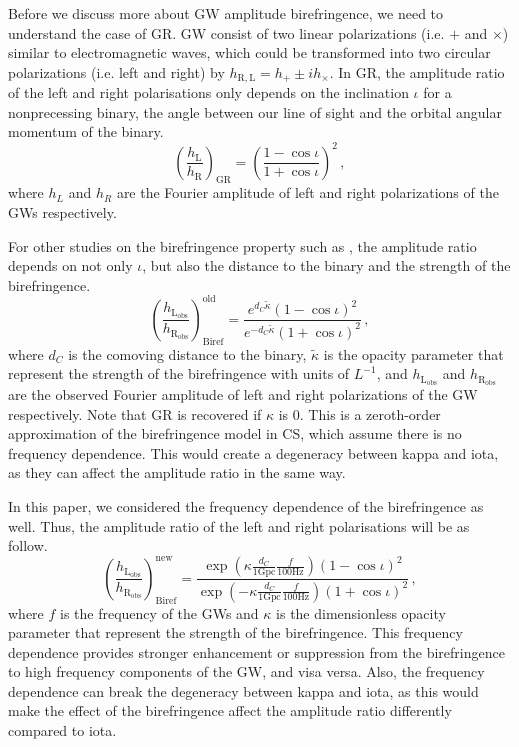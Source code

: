 \documentclass[twocolumn]{aastex631}
\begin{document}
Before we discuss more about GW amplitude birefringence, we need to understand the case of GR.
GW consist of two linear polarizations (i.e. $+$ and $\times$) similar to electromagnetic waves,
which could be transformed into two circular polarizations (i.e. left and right) by $h_{\mathrm{R}, \mathrm{L}} = h_+ \pm i h_\times$.
In GR, the amplitude ratio of the left and right polarisations only depends on the inclination $\iota$ for a nonprecessing binary,
the angle between our line of sight and the orbital angular momentum of the binary.
\begin{equation}
    \left(\frac{h_\mathrm{L}}{h_\mathrm{R}}\right)_\mathrm{GR}=\left(\frac{1-\cos\iota}{1+\cos\iota}\right)^2\,,
\end{equation}where $h_L$ and $h_R$ are the Fourier amplitude of left and right polarizations of the GWs respectively.

For other studies on the birefringence property such as \citet{Maria_2021}, the amplitude ratio depends on not only $\iota$,
but also the distance to the binary and the strength of the birefringence.
\begin{equation}
    \left(\frac{h_\mathrm{L_{obs}}}{h_\mathrm{R_{obs}}}\right)_\mathrm{Biref}^\mathrm{old}=\frac{e^{d_C\widetilde{\kappa}}\left(1-\cos\iota\right)^2}{e^{-d_C\widetilde{\kappa}}\left(1+\cos\iota\right)^2}\,,
\end{equation}where $d_C$ is the comoving distance to the binary, $\widetilde{\kappa}$ is the opacity parameter that represent
the strength of the birefringence with units of $L^{-1}$, and $h_\mathrm{L_{obs}}$ and $h_\mathrm{R_{obs}}$ are
the observed Fourier amplitude of left and right polarizations of the GW respectively. Note that GR is recovered if $\kappa$ is 0.
This is a zeroth-order approximation of the birefringence model in CS, which assume there is no frequency dependence.
This would create a degeneracy between kappa and iota, as they can affect the amplitude ratio in the same way.

In this paper, we considered the frequency dependence of the birefringence as well.
Thus, the amplitude ratio of the left and right polarisations will be as follow.
\begin{equation}
    \left(\frac{h_\mathrm{L_{obs}}}{h_\mathrm{R_{obs}}}\right)_\mathrm{Biref}^\mathrm{new}=\frac{\exp\left({\kappa\frac{d_C}{1\mathrm{ Gpc}}\frac{f}{100\mathrm{ Hz}}}\right)\left(1-\cos\iota\right)^2}{\exp\left({-\kappa\frac{d_C}{1\mathrm{Gpc}}\frac{f}{100\mathrm{Hz}}}\right)\left(1+\cos\iota\right)^2}\,,
\end{equation}where $f$ is the frequency of the GWs and $\kappa$ is the dimensionless opacity parameter that represent the strength of the birefringence.
This frequency dependence provides stronger enhancement or suppression from the birefringence to high frequency components of the GW, and visa versa.
Also, the frequency dependence can break the degeneracy between kappa and iota,
as this would make the effect of the birefringence affect the amplitude ratio differently compared to iota.
\end{document}
